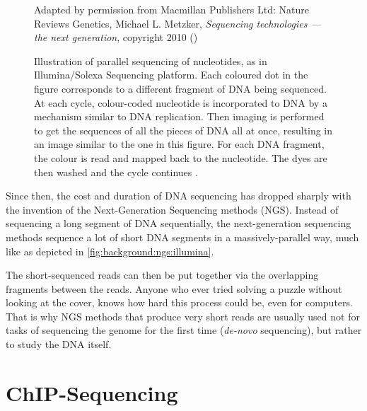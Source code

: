 \documentclass[parskip]{cs4rep}
\begin{document}
    
\begin{figure}
    \centering
    {Adapted by permission from Macmillan Publishers Ltd: Nature Reviews Genetics,
     Michael L. Metzker, \emph{Sequencing technologies — the next generation}, copyright 2010 (\cite{Metzker:j6NWuwFp})}
    \caption{Illustration of parallel sequencing of nucleotides, as in Illumina/Solexa Sequencing platform.
    Each coloured dot in the figure corresponds to a different fragment of DNA being sequenced. 
    At each cycle, colour-coded nucleotide is incorporated to DNA by a mechanism similar to DNA replication. Then imaging is performed to get the sequences of all the pieces of DNA all at once, resulting in an image similar to the one in this figure. For each DNA fragment, the colour is read and mapped back to the nucleotide. The dyes are then washed and the cycle continues \cite{Metzker:j6NWuwFp}.}
    \label{fig:background:ngs:illumina}
\end{figure}

Since then, the cost and duration of DNA sequencing has dropped sharply with the invention of
the Next-Generation Sequencing methods (NGS). Instead of sequencing a long segment of DNA sequentially,
the next-generation sequencing methods sequence a lot of short DNA segments in a massively-parallel way, much like as depicted in \autoref{fig:background:ngs:illumina}.

The short-sequenced reads can then be put together via the overlapping fragments between the reads. Anyone who ever tried solving a puzzle without looking at the cover, knows how hard this process could be, even for computers. That is why NGS methods that produce very short reads are usually used not for tasks of sequencing the genome for the first time (\emph{de-novo} sequencing), but
rather to study the DNA itself.

\section{ChIP-Sequencing}
\label{sec:chip}
\end{document}
